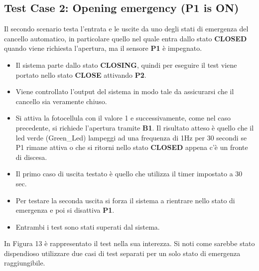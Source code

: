 \documentclass[12pt]{article}
\begin{document}
\subsection{Test Case 2: Opening emergency (P1 is ON)}

Il secondo scenario testa l'entrata e le uscite da uno degli stati di emergenza del cancello automatico, in particolare quello nel quale entra dallo stato \textbf{CLOSED} quando viene richiesta l'apertura, ma il sensore \textbf{P1} è impegnato.

\begin{itemize}
    \item Il sistema parte dallo stato \textbf{CLOSING}, quindi per eseguire il test viene portato nello stato \textbf{CLOSE} attivando \textbf{P2}.
    \item Viene controllato l'output del sistema in modo tale da assicurarsi che il cancello sia veramente chiuso.
    \item Si attiva la fotocellula con il valore 1 e successivamente, come nel caso precedente, si richiede l'apertura tramite \textbf{B1}. Il risultato atteso è quello che il led verde (Green\_Led) lampeggi ad una frequenza di 1Hz per 30 secondi se P1 rimane attiva o che si ritorni nello stato \textbf{CLOSED} appena c'è un fronte di discesa.
    \item Il primo caso di uscita testato è quello che utilizza il timer impostato a 30 sec.
    \item Per testare la seconda uscita si forza il sistema a rientrare nello stato di emergenza e poi si disattiva \textbf{P1}.
    \item Entrambi i test sono stati superati dal sistema.
\end{itemize}

In Figura 13 è rappresentato il test nella sua interezza. Si noti come sarebbe stato dispendioso utilizzare due casi di test separati per un solo stato di emergenza raggiungibile.
\end{document}
